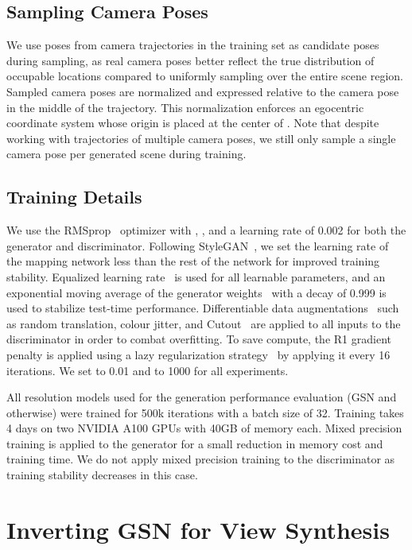 \documentclass[10pt,twocolumn,letterpaper]{article}
\begin{document}
\subsection{Sampling Camera Poses}
We use poses from  camera trajectories in the training set as candidate poses during sampling, as real camera poses better reflect the true distribution of occupable locations compared to uniformly sampling over the entire scene region. Sampled camera poses are normalized and expressed relative to the camera pose in the middle of the trajectory. This normalization enforces an egocentric coordinate system whose origin is placed at the center of . Note that despite working with trajectories of multiple camera poses, we still only sample a single camera pose per generated scene during training.

\subsection{Training Details} We use the RMSprop~\cite{rmsprop} optimizer with , , and a learning rate of 0.002 for both the generator and discriminator. Following StyleGAN~\cite{stylegan}, we set the learning rate of the mapping network  less than the rest of the network for improved training stability. Equalized learning rate~\cite{progan} is used for all learnable parameters, and an exponential moving average of the generator weights~\cite{progan} with a decay of 0.999 is used to stabilize test-time performance. Differentiable data augmentations~\cite{diffaugment} such as random translation, colour jitter, and Cutout~\cite{cutout} are applied to all inputs to the discriminator in order to combat overfitting. To save compute, the R1 gradient penalty is applied using a lazy regularization strategy~\cite{stylegan2} by applying it every 16 iterations. We set  to 0.01 and  to 1000 for all experiments.

All  resolution models used for the generation performance evaluation (GSN and otherwise) were trained for 500k iterations with a batch size of 32. Training takes 4 days on two NVIDIA A100 GPUs with 40GB of memory each. Mixed precision training is applied to the generator for a small reduction in memory cost and training time. We do not apply mixed precision training to the discriminator as training stability decreases in this case.


\section{Inverting GSN for View Synthesis}
\end{document}
